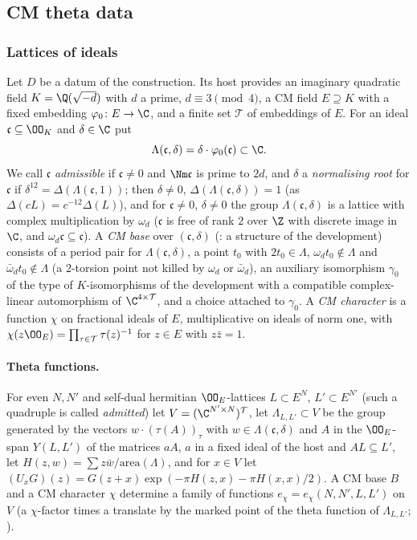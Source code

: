 \subsection{CM theta data}\label{pf:reckernel:sec-theta}

\subsubsection{Lattices of ideals}
Let $D$ be a datum of the construction. Its host provides an imaginary quadratic field $K=\Q(\sqrt{-d})$ with $d$ a
prime, $d\equiv3\pmod 4$, a CM field $E\supseteq K$ with a fixed embedding $\varphi_0\colon E\to\C$, and a finite set
$\mathcal T$ of embeddings of $E$. For an ideal $\mathfrak c\subseteq\OO_K$ and $\delta\in\C$ put
\[
\Lambda(\mathfrak c,\delta)=\delta\cdot\varphi_0(\mathfrak c)\subset\C .
\]
We call $\mathfrak c$ \emph{admissible} if $\mathfrak c\ne0$ and $\Nm\mathfrak c$ is prime to $2d$, and $\delta$ a
\emph{normalising root} for $\mathfrak c$ if $\delta^{12}=\Delta(\Lambda(\mathfrak c,1))$; then $\delta\ne0$,
$\Delta(\Lambda(\mathfrak c,\delta))=1$ (as $\Delta(cL)=c^{-12}\Delta(L)$), and for $\mathfrak c\ne0$, $\delta\ne0$ the group
$\Lambda(\mathfrak c,\delta)$ is a lattice with complex multiplication by $\omega_d$ ($\mathfrak c$ is free of rank $2$
over $\Z$ with discrete image in $\C$, and $\omega_d\mathfrak c\subseteq\mathfrak c$). A \emph{CM base} over $(\mathfrak c,\delta)$
(: a structure of the development) consists of a period pair for
$\Lambda(\mathfrak c,\delta)$, a point $t_0$ with $2t_0\in\Lambda$, $\omega_dt_0\notin\Lambda$ and
$\bar\omega_dt_0\notin\Lambda$ (a $2$-torsion point not killed by $\omega_d$ or $\bar\omega_d$), an auxiliary isomorphism
$\gamma_0$ of the type of $K$-isomorphisms of the development with a compatible complex-linear automorphism of
$\C^{4\times\mathcal T}$, and a choice attached to $\gamma_0$. A \emph{CM character} is a function $\chi$ on
fractional ideals of $E$, multiplicative on ideals of norm one, with $\chi(z\OO_E)=\prod_{\tau\in\mathcal T}\tau(z)^{-1}$
for $z\in E$ with $z\bar z=1$.

\paragraph{Theta functions.}
For even $N,N'$ and self-dual hermitian $\OO_E$-lattices $L\subset E^N$, $L'\subset E^{N'}$ (such a quadruple is
called \emph{admitted}) let $V=(\C^{N'\times N})^{\mathcal T}$, let $\Lambda_{L,L'}\subset V$ be the group generated
by the vectors $w\cdot(\tau(A))_\tau$ with $w\in\Lambda(\mathfrak c,\delta)$ and $A$ in the $\OO_E$-span $Y(L,L')$ of the
matrices $aA$, $a$ in a fixed ideal of the host and $AL\subseteq L'$, let $H(z,w)=\sum z\bar w/\mathrm{area}(\Lambda)$,
and for $x\in V$ let $(U_xG)(z)=G(z+x)\exp(-\pi H(z,x)-\pi H(x,x)/2)$. A CM base $B$ and a CM character $\chi$ determine
a family of functions $e_\chi=e_\chi(N,N',L,L')$ on $V$ (a $\chi$-factor times a translate by the marked point of the
theta function of $\Lambda_{L,L'}$; ).

